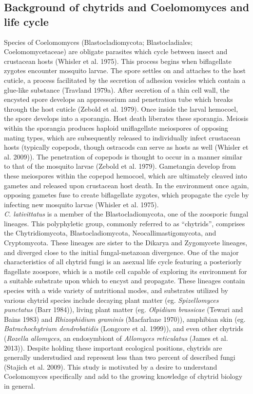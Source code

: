 \subsection{Background of chytrids and Coelomomyces and life cycle}
Species of Coelomomyces (Blastocladiomycota; Blastocladiales; Coelomomycetaceae) are obligate parasites which cycle between insect and crustacean hosts (Whisler et al. 1975). This process begins when biflagellate zygotes encounter mosquito larvae. The spore settles on and attaches to the host cuticle, a process facilitated by the secretion of adhesion vesicles which contain a glue-like substance (Travland 1979a). After secretion of a thin cell wall, the encysted spore develops an appressorium and penetration tube which breaks through the host cuticle (Zebold et al. 1979). Once inside the larval hemocoel, the spore develops into a sporangia. Host death liberates these sporangia. Meiosis within the sporangia produces haploid uniflagellate meiospores of opposing mating types, which are subsequently released to individually infect crustacean hosts (typically copepods, though ostracods can serve as hosts as well (Whisler et al. 2009)). The penetration of copepods is thought to occur in a manner similar to that of the mosquito larvae (Zebold et al. 1979). Gametangia develop from these meiospores within the copepod hemocoel, which are ultimately cleaved into gametes and released upon crustacean host death. In the environment once again, opposing gametes fuse to create biflagellate zygotes, which propagate the cycle by infecting new mosquito larvae (Whisler et al. 1975).\\
\indent \textit{C. lativittatus} is a member of the Blastocladiomycota, one of the zoosporic fungal lineages. This polyphyletic group, commonly referred to as “chytrids”, comprises the Chytridiomycota, Blastocladiomycota, Neocallimastigomycota, and Cryptomycota. These lineages are sister to the Dikarya and Zygomycete lineages, and diverged close to the initial fungal-metazoan divergence. One of the major characteristics of all chytrid fungi is an asexual life cycle featuring a posteriorly flagellate zoospore, which is a motile cell capable of exploring its environment for a suitable substrate upon which to encyst and propagate. These lineages contain species with a wide variety of nutritional modes, and substrates utilized by various chytrid species include decaying plant matter (eg. \textit{Spizellomyces punctatus} (Barr 1984)), living plant matter (eg. \textit{Olpidium brassicae} (Tewari and Bains 1983) and \textit{Rhizophidium graminis} (Macfarlane 1970)), amphibian skin (eg. \textit{Batrachochytrium dendrobatidis} (Longcore et al. 1999)), and even other chytrids (\textit{Rozella allomyces}, an endosymbiont of \textit{Allomyces reticulatus} (James et al. 2013)). Despite holding these important ecological positions, chytrids are generally understudied and represent less than two percent of described fungi (Stajich et al. 2009). This study is motivated by a desire to understand Coelomomyces specifically and add to the growing knowledge of chytrid biology in general. \\
